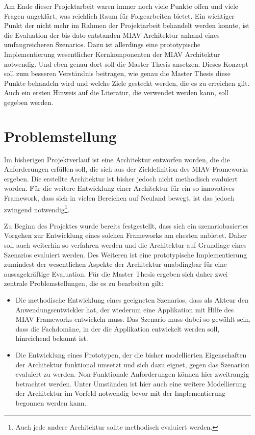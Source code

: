 \documentclass[12pt,headsepline,a4paper,bibtotoc,liststotoc,DIV12,BCOR12mm]{scrartcl}
\begin{document}
  Am Ende dieser Projektarbeit waren immer noch viele Punkte offen und viele Fragen ungeklärt, was reichlich Raum für Folgearbeiten bietet. Ein wichtiger Punkt der nicht mehr im Rahmen der Projektarbeit behandelt werden konnte, ist die Evaluation der bis dato entstanden MIAV Architektur anhand eines umfangreicheren Szenarios. Dazu ist allerdings eine prototypische Implementierung wesentlicher Kernkomponenten der MIAV Architektur notwendig. Und eben genau dort soll die Master Thesis ansetzen. Dieses Konzept soll zum besseren Verständnis beitragen, wie genau die Master Thesis diese Punkte behandeln wird und welche Ziele gesteckt werden, die es zu erreichen gilt. Auch ein ersten Hinweis auf die Literatur, die verwendet werden kann, soll gegeben werden.


\section{Problemstellung} %
\label{sec:problemstellung}

  Im bisherigen Projektverlauf ist eine Architektur entworfen worden, die die Anforderungen erfüllen soll, die sich aus der Zieldefinition des MIAV-Frameworks ergeben. Die erstellte Architektur ist bisher jedoch nicht methodisch evaluiert worden. Für die weitere Entwicklung einer Architektur für ein so innovatives Framework, dass sich in vielen Bereichen auf Neuland bewegt, ist das jedoch zwingend notwendig\footnote{Auch jede andere Architektur sollte methodisch evaluiert werden.}.
  
  Zu Beginn des Projektes wurde bereits festgestellt, dass sich ein szenariobasiertes Vorgehen zur Entwicklung eines solchen Frameworks am ehesten anbietet. Daher soll auch weiterhin so verfahren werden und die Architektur auf Grundlage eines Szenarios evaluiert werden. Des Weiteren ist eine prototypische Implementierung zumindest der wesentlichen Aspekte der Architektur unabdingbar für eine aussagekräftige Evaluation. Für die Master Thesis ergeben sich daher zwei zentrale Problemstellungen, die es zu bearbeiten gilt:
  
  \begin{itemize}
    \item Die methodische Entwicklung eines geeigneten Szenarios, dass als Akteur den Anwendungsentwickler hat, der wiederum eine Applikation mit Hilfe des MIAV-Frameworks entwickeln muss. Das Szenario muss dabei so gewählt sein, dass die Fachdomäne, in der die Applikation entwickelt werden soll, hinreichend bekannt ist.
    \item Die Entwicklung eines Prototypen, der die bisher modellierten Eigenschaften der Architektur funktional umsetzt und sich dazu eignet, gegen das Szenarion evaluiert zu werden. Non-Funktionale Anforderungen können hier zweitrangig betrachtet werden. Unter Umständen ist hier auch eine weitere Modellierung der Architektur im Vorfeld notwendig bevor mit der Implementierung begonnen werden kann.
  \end{itemize}
\end{document}
